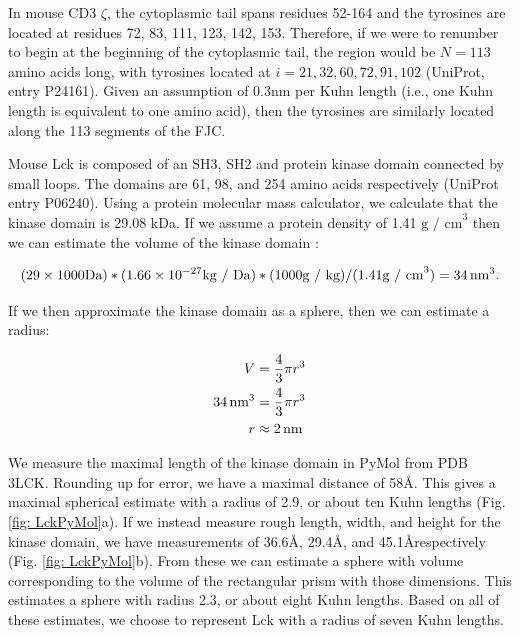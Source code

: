 \documentclass[../AdvancementSummary.tex]{subfiles}
\begin{document}
In mouse CD3 $\zeta$, the cytoplasmic tail spans residues 52-164 and the tyrosines are located at residues 72, 83, 111, 123, 142, 153. Therefore, if we were to renumber to begin at the beginning of the cytoplasmic tail, the region would be $N=113$ amino acids long, with tyrosines located at $i= 21, 32, 60, 72, 91, 102$ (UniProt, entry P24161). Given an assumption of 0.3nm per Kuhn length (i.e., one Kuhn length is equivalent to one amino acid), then the tyrosines are similarly located along the 113 segments of the FJC.

Mouse Lck is composed of an SH3, SH2 and protein kinase domain connected by small loops. The domains are 61, 98, and 254 amino acids respectively (UniProt entry P06240). Using a protein molecular mass calculator, %
we calculate that the kinase domain is 29.08 kDa. If we assume a protein density of 1.41 $\mbox{g / cm}^3$ then we can estimate the volume of the kinase domain \cite{Fischer2004}:

\begin{equation*}
(29 \times 1000 \mbox{Da}) * (1.66\times10^{-27} \mbox{kg / Da}) * (1000 \mbox{g / kg}) / (1.41 \mbox{g / cm}^3) = 34 \,\mbox{nm}^3.
\end{equation*}

If we then approximate the kinase domain as a sphere, then we can estimate a radius: 

\begin{align*}
V &= \frac{4}{3}\pi r^3 \\
34 \,\mbox{nm}^3 &= \frac{4}{3} \pi r^3 \\
r &\approx 2 \,\mbox{nm} \\
\end{align*}
%

We measure the maximal length of the kinase domain in PyMol from PDB 3LCK. Rounding up for error, we have a maximal distance of 58\AA. This gives a maximal spherical estimate with a radius of 2.9\nm, or about ten Kuhn lengths (Fig. \ref{fig: LckPyMol}a). If we instead measure rough length, width, and height for the kinase domain, we have measurements of 36.6\AA, 29.4\AA, and 45.1\AA respectively (Fig. \ref{fig: LckPyMol}b). From these we can estimate a sphere with volume corresponding to the volume of the rectangular prism with those dimensions. This estimates a sphere with radius 2.3\nm, or about eight Kuhn lengths. Based on all of these estimates, we choose to represent Lck with a radius of seven Kuhn lengths.
\end{document}
